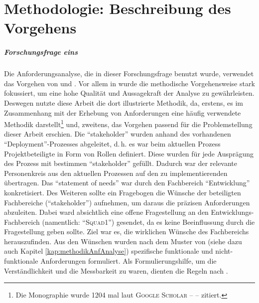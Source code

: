 \chapter{Methodologie: Beschreibung des Vorgehens}\label{kap:methodology}
\paragraph{Forschungsfrage eins}
Die Anforderungsanalyse, die in dieser Forschungsfrage benutzt wurde, verwendet das Vorgehen von \cite{hull_requirements_2011} und \cite{partsch_requirements-engineering_2010}. Vor allem in \cite{hull_requirements_2011} wurde die methodische Vorgehensweise stark fokussiert, um eine hohe Qualität und Aussagekraft der Analyse zu gewährleisten. Deswegen nutzte diese Arbeit die dort illustrierte Methodik, da, erstens, es im Zusammenhang mit der Erhebung von Anforderungen eine häufig verwendete Methodik darstellt\footnote{Die Monographie wurde 1204 mal laut \textsc{Google Scholar} -- \cite{google_llc_google_2020} -- zitiert.} und, zweitens, das Vorgehen passend für die Problemstellung dieser Arbeit erschien. Die \enquote{stakeholder} wurden anhand des vorhandenen \enquote{Deployment}-Prozesses abgeleitet, d.\,h. es war beim aktuellen Prozess Projektbeteiligte in Form von Rollen definiert. Diese wurden für jede Ausprägung des Prozess mit bestimmen \enquote{stakeholder} gefüllt. Dadurch war der relevante Personenkreis aus den aktuellen Prozessen auf den zu implementierenden übertragen. Das \enquote{statement of needs} war durch den Fachbereich \enquote{Entwicklung} konkretisiert. Des Weiteren sollte ein Fragebogen die Wünsche der beteiligten Fachbereiche (\enquote{stakeholder}) aufnehmen, um daraus die präzisen Anforderungen abzuleiten. Dabei ward absichtlich eine offene Fragestellung an den Entwicklungs-Fachbereich (namentlich: \enquote{\textsc{Squad1}}) gesendet, da es keine Beeinflussung durch die Fragestellung geben sollte. Ziel war es, die wirklichen Wünsche des Fachbereichs herauszufinden. Aus den Wünschen wurden nach dem Muster von \cite[vgl.][S.\,28]{hull_requirements_2011} (siehe dazu auch Kapitel \vref{kap:methodikAnfAnalyse}) spezifische funktionale und nicht-funktionale Anforderungen formuliert. Als Formulierungshilfe, um die Verständlichkeit und die Messbarkeit zu waren, dienten die Regeln nach \cite{rupp_formulierungsregel_2020}. 
\par
